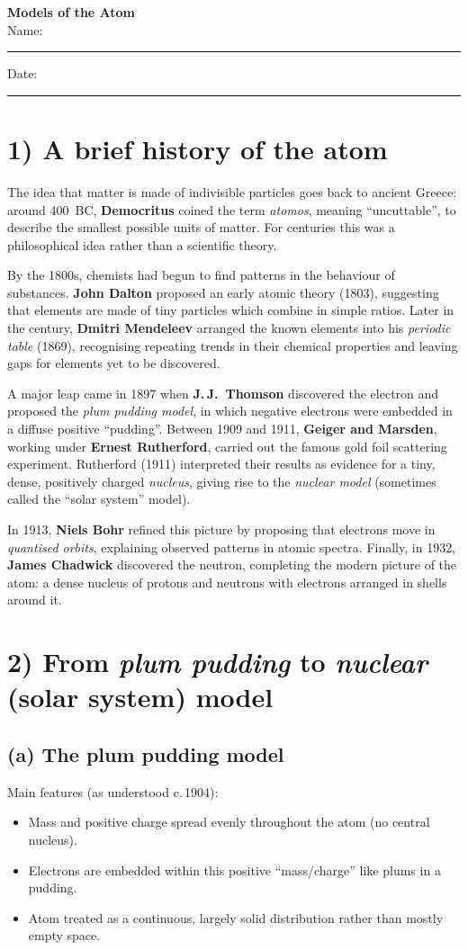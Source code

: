 \documentclass[11pt,a4paper]{article}
\begin{document}
\begin{center}
  {\LARGE \textbf{Models of the Atom}}\\[2mm]
  \normalsize Name:\rule{0.4\linewidth}{0.4pt}\hfill Date:\rule{0.25\linewidth}{0.4pt}
\end{center}

\section*{1) A brief history of the atom}
The idea that matter is made of indivisible particles goes back to ancient Greece: around 400~BC, \textbf{Democritus} coined the term \emph{atomos}, meaning ``uncuttable'', to describe the smallest possible units of matter. For centuries this was a philosophical idea rather than a scientific theory.  

By the 1800s, chemists had begun to find patterns in the behaviour of substances. \textbf{John Dalton} proposed an early atomic theory (1803), suggesting that elements are made of tiny particles which combine in simple ratios. Later in the century, \textbf{Dmitri Mendeleev} arranged the known elements into his \emph{periodic table} (1869), recognising repeating trends in their chemical properties and leaving gaps for elements yet to be discovered.  

A major leap came in 1897 when \textbf{J.\,J.\ Thomson} discovered the electron and proposed the \emph{plum pudding model}, in which negative electrons were embedded in a diffuse positive ``pudding''. Between 1909 and 1911, \textbf{Geiger and Marsden}, working under \textbf{Ernest Rutherford}, carried out the famous gold foil scattering experiment. Rutherford (1911) interpreted their results as evidence for a tiny, dense, positively charged \emph{nucleus}, giving rise to the \emph{nuclear model} (sometimes called the ``solar system'' model).  

In 1913, \textbf{Niels Bohr} refined this picture by proposing that electrons move in \emph{quantised orbits}, explaining observed patterns in atomic spectra. Finally, in 1932, \textbf{James Chadwick} discovered the neutron, completing the modern picture of the atom: a dense nucleus of protons and neutrons with electrons arranged in shells around it.


\section*{2) From \emph{plum pudding} to \emph{nuclear} (solar system) model}
\subsection*{(a) The plum pudding model}
Main features (as understood c.\,1904):
\begin{itemize}
  \item Mass and positive charge spread evenly throughout the atom (no central nucleus).
  \item Electrons are embedded within this positive ``mass/charge'' like plums in a pudding.
  \item Atom treated as a continuous, largely solid distribution rather than mostly empty space.
\end{itemize}
\end{document}
